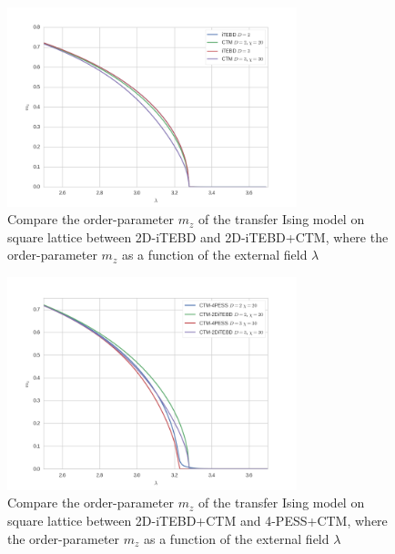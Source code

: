 \begin{figure}[H]
	\centering
	\includegraphics[width=0.75\textwidth]{figures/ctm_itebd.png}
	\caption[Compare the order-parameter $m_z$ of the transfer Ising model on square lattice between 2D-iTEBD and 2D-iTEBD+CTM.]{Compare the order-parameter $m_z$ of the transfer Ising model on square lattice between 2D-iTEBD and 2D-iTEBD+CTM, where the order-parameter $m_z$ as a function of the external field $\lambda$}
	\label{fig522}
\end{figure}

\begin{figure}[H]
	\centering
	\includegraphics[width=0.75\textwidth]{figures/ctm_pess.png}
	\caption[Compare the order-parameter $m_z$ of the transfer Ising model on square lattice between 2D-iTEBD+CTM and 4-PESS+CTM.]{Compare the order-parameter $m_z$ of the transfer Ising model on square lattice between 2D-iTEBD+CTM and 4-PESS+CTM, where the order-parameter $m_z$ as a function of the external field $\lambda$}
	\label{fig523}
\end{figure}


